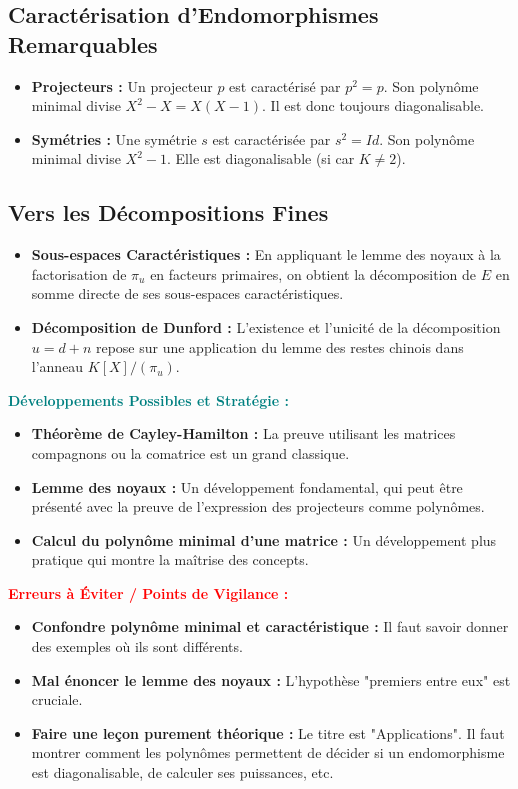 \documentclass[12pt, a4paper, parskip=full]{report}
\theoremstyle{agregstyle}
\newenvironment{developpements}
  {\par\medskip\noindent\begin{oframed}\noindent\textbf{\textcolor{teal}{Développements Possibles et Stratégie :}}}
  {\end{oframed}\par\medskip}
\newenvironment{erreurs}
  {\par\medskip\noindent\begin{oframed}\noindent\textbf{\textcolor{red}{Erreurs à Éviter / Points de Vigilance :}}}
  {\end{oframed}\par\medskip}
\begin{document}
\subsection{Caractérisation d'Endomorphismes Remarquables}
\begin{itemize}
    \item \textbf{Projecteurs :} Un projecteur $p$ est caractérisé par $p^2=p$. Son polynôme minimal divise $X^2-X = X(X-1)$. Il est donc toujours diagonalisable.
    \item \textbf{Symétries :} Une symétrie $s$ est caractérisée par $s^2=Id$. Son polynôme minimal divise $X^2-1$. Elle est diagonalisable (si car $K \neq 2$).
\end{itemize}

\subsection{Vers les Décompositions Fines}
\begin{itemize}
    \item \textbf{Sous-espaces Caractéristiques :} En appliquant le lemme des noyaux à la factorisation de $\pi_u$ en facteurs primaires, on obtient la décomposition de $E$ en somme directe de ses sous-espaces caractéristiques.
    \item \textbf{Décomposition de Dunford :} L'existence et l'unicité de la décomposition $u=d+n$ repose sur une application du lemme des restes chinois dans l'anneau $K[X]/(\pi_u)$.
\end{itemize}

\begin{developpements}
    \begin{itemize}
        \item \textbf{Théorème de Cayley-Hamilton :} La preuve utilisant les matrices compagnons ou la comatrice est un grand classique.
        \item \textbf{Lemme des noyaux :} Un développement fondamental, qui peut être présenté avec la preuve de l'expression des projecteurs comme polynômes.
        \item \textbf{Calcul du polynôme minimal d'une matrice :} Un développement plus pratique qui montre la maîtrise des concepts.
    \end{itemize}
\end{developpements}

\begin{erreurs}
    \begin{itemize}
        \item \textbf{Confondre polynôme minimal et caractéristique :} Il faut savoir donner des exemples où ils sont différents.
        \item \textbf{Mal énoncer le lemme des noyaux :} L'hypothèse "premiers entre eux" est cruciale.
        \item \textbf{Faire une leçon purement théorique :} Le titre est "Applications". Il faut montrer comment les polynômes permettent de décider si un endomorphisme est diagonalisable, de calculer ses puissances, etc.
    \end{itemize}
\end{erreurs}
\end{document}
